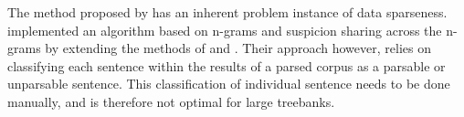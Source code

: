 The method proposed by \citeauthor{boyd} has an inherent problem instance of data sparseness. \cite{kook} implemented an algorithm based on n-grams and suspicion sharing across the n-grams by extending the methods of \cite{sagot} and \cite{noord}. Their approach however, relies on classifying each sentence within the results of a parsed corpus as a parsable or unparsable sentence. This classification of individual sentence needs to be done manually, and is therefore not optimal for large treebanks.